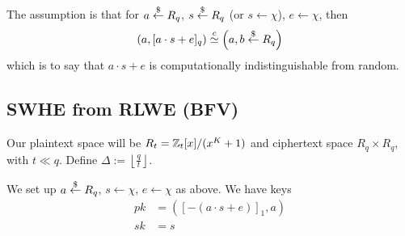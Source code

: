The assumption is that for $a\overset{\$}{\leftarrow} R_q$, $s\overset{\$}{\leftarrow} R_q$ (or $s\leftarrow \chi$), $e\leftarrow \chi$, then
\[\left( a, [a\cdot s + e]_q \right) \overset{c}{\simeq} \left( a, b\overset{\$}{\leftarrow} R_q \right)\]
which is to say that $a\cdot s + e$ is computationally indistinguishable from random.

\subsection{SWHE from RLWE (BFV)}
Our plaintext space will be $R_t = \mathbb Z_t[x]/(x^K + 1)$ and ciphertext space $R_q\times R_q$, with $t\ll q$. Define $\Delta := \left\lfloor \frac{q}{t}\right\rfloor$.

We set up $a\overset{\$}{\leftarrow} R_q$, $s\leftarrow \chi$, $e\leftarrow \chi$ as above. We have keys
\begin{align*}
    pk & = \left( [-(a\cdot s + e)]_1, a \right) \\
    sk & = s
\end{align*}

